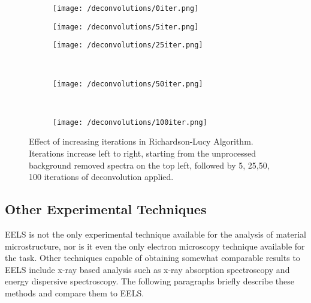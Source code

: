 \begin{figure}

	\begin{subfigure}{0.3 \textwidth}
		\texttt{[image: /deconvolutions/0iter.png]}
	\end{subfigure}
	\hfill
	\begin{subfigure}{0.3 \textwidth}
		\texttt{[image: /deconvolutions/5iter.png]}
	\end{subfigure}
	\hfill
	\begin{subfigure}{0.3 \textwidth}
		\texttt{[image: /deconvolutions/25iter.png]}
	\end{subfigure}
	\\
	\begin{subfigure}{0.33 \textwidth}
		
		\texttt{[image: /deconvolutions/50iter.png]}
	\end{subfigure}
	~
	\begin{subfigure}{0.33 \textwidth}
		
		\texttt{[image: /deconvolutions/100iter.png]}
	\end{subfigure}

	\begin{subfigure}{0.33 \textwidth}
	\end{subfigure}

	\caption{Effect of increasing iterations in Richardson-Lucy Algorithm.  Iterations increase left to right, starting from the unprocessed background removed spectra on the top left, followed by 5, 25,50, 100 iterations of deconvolution applied.  }
	\label{RL_iter}
\end{figure}


\subsection{Other Experimental Techniques}
EELS is not the only experimental technique available for the analysis of material microstructure, nor is it even the only electron microscopy technique available for the task. Other techniques capable of obtaining somewhat comparable results to EELS include x-ray based analysis such as x-ray absorption spectroscopy and energy dispersive spectroscopy.  The following paragraphs briefly describe these methods and compare them to EELS.

